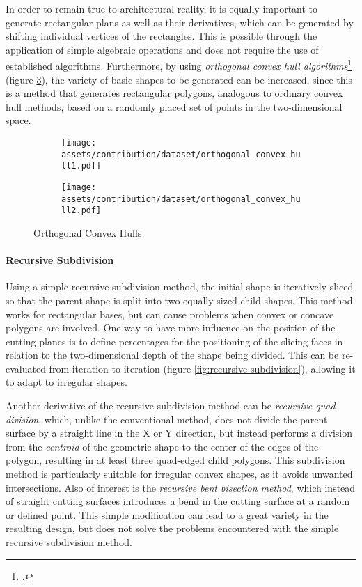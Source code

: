\documentclass[a4paper, 12pt]{report}
\begin{document}
In order to remain true to architectural reality, it is equally important to generate rectangular plans as well as their derivatives, which can be generated by shifting individual vertices of the rectangles. This is possible through the application of simple algebraic operations and does not require the use of established algorithms. Furthermore, by using \textit{orthogonal convex hull algorithms}\footcite{an2021modified} (figure \ref{fig:orthogonal-convex-hull}), the variety of basic shapes to be generated can be increased, since this is a method that generates rectangular polygons, analogous to ordinary convex hull methods, based on a randomly placed set of points in the two-dimensional space.

\begin{figure}
\centering
\begin{subfigure}{.5\textwidth}
\centering
\texttt{[image: assets/contribution/dataset/orthogonal\_convex\_hull1.pdf]}
\label{fig:orthogonal-convex-hull-1}
\end{subfigure}%
\begin{subfigure}{.5\textwidth}
\centering
\texttt{[image: assets/contribution/dataset/orthogonal\_convex\_hull2.pdf]}
\label{fig:orthogonal-convex-hull-2}
\end{subfigure}
\caption{Orthogonal Convex Hulls}
\label{fig:orthogonal-convex-hull}
\end{figure}

\paragraph{Recursive Subdivision}\label{par:recursive-subdivision}

Using a simple recursive subdivision method, the initial shape is iteratively sliced so that the parent shape is split into two equally sized child shapes. This method works for rectangular bases, but can cause problems when \gls{convex} or concave polygons are involved. One way to have more influence on the position of the cutting planes is to define percentages for the positioning of the slicing faces in relation to the two-dimensional depth of the shape being divided. This can be re-evaluated from iteration to iteration (figure \ref{fig:recursive-subdivision}), allowing it to adapt to irregular shapes.

Another derivative of the recursive subdivision method can be \textit{recursive quad-division}, which, unlike the conventional method, does not divide the parent surface by a straight line in the X or Y direction, but instead performs a division from the \textit{\gls{centroid}} of the geometric shape to the center of the edges of the polygon, resulting in at least three quad-edged child polygons. This subdivision method is particularly suitable for irregular \gls{convex} shapes, as it avoids unwanted intersections. Also of interest is the \textit{recursive bent bisection method}, which instead of straight cutting surfaces introduces a bend in the cutting surface at a random or defined point. This simple modification can lead to a great variety in the resulting design, but does not solve the problems encountered with the simple recursive subdivision method.
\end{document}
